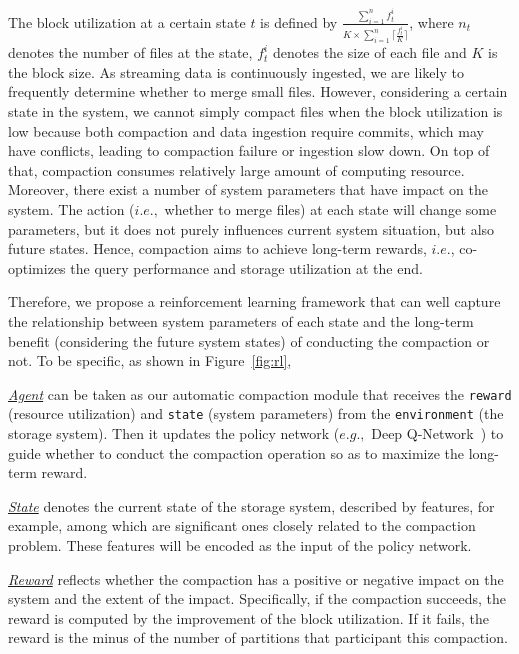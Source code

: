 The block utilization at a certain state $t$ is defined by $\frac{\sum_{i=1}^{n}f_t^i}{K \times  \sum_{i=1}^{n}\lceil \frac{f_t^i}{K}\rceil}$, where $n_t$ denotes the number of files at the state, $f_t^i$ denotes the size of each file and $K$ is the block size.
 As streaming data is continuously ingested,  we are likely to frequently determine whether to merge small files.
  However, considering a certain state in the system, we cannot simply  compact files when the block utilization is low because both compaction and data ingestion require commits, which may have conflicts, leading to compaction failure or ingestion slow down. On top of that, compaction consumes relatively large amount of computing resource. Moreover,  there exist a number of system parameters  that have impact on  the system.  The action ($i.e.,$ whether to merge files) at each state will change some parameters, but it does not purely influences current system situation, but also future states. 
  Hence, compaction aims to achieve long-term rewards, $i.e.$, co-optimizes the query performance  and storage utilization at the end.
  

Therefore, we propose a reinforcement learning framework that can well capture the relationship between system parameters of each state and the long-term benefit (considering the future system states) of conducting the compaction or not. 
To be specific, as shown in  Figure~\ref{fig:rl}, 

\noindent \underline{\textit{Agent}} can be taken as our automatic compaction module that receives the \texttt{reward} (resource utilization) and \texttt{state} (system parameters) from the \texttt{environment} (the storage system). Then it updates the policy network ($e.g.,$ Deep Q-Network~\cite{dqn,dqn2}) to guide whether to conduct the compaction operation so as to maximize the long-term reward.

\noindent \underline{\textit{State}} denotes the current state of the storage system, described by  features, for example, among which  are significant ones closely  related to the compaction problem. These features will be encoded as the input of the policy network.

\noindent \underline{\textit{Reward}}  reflects whether the compaction  has a positive or negative impact on the system and the extent of the impact. Specifically, if the compaction succeeds, the reward is  computed by the improvement of the block utilization. If it fails, the reward is the minus of the number of partitions that participant this compaction.

